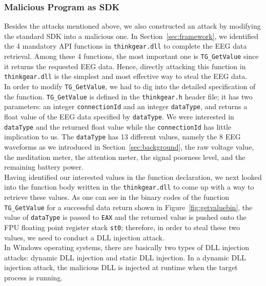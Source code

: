 \subsubsection{Malicious Program as SDK}
Besides the attacks mentioned above, we also constructed an attack by modifying the standard SDK into a malicious one. In Section~\ref{sec:framework}, we identified the 4 mandatory API functions in \texttt{thinkgear.dll} to complete the EEG data retrieval. Among these 4 functions, the most important one is \texttt{TG\_GetValue} since it returns the requested EEG data. Hence, directly attacking this function in \texttt{thinkgear.dll} is the simplest and most effective way to steal the EEG data. \\
%
\indent In order to modify \texttt{TG\_GetValue}, we had to dig into the detailed specification of the function. \texttt{TG\_GetValue} is defined in the \texttt{thinkgear.h} header file; it has two parameters: an integer \texttt{connectionId} and an integer \texttt{dataType}, and returns a float value of the EEG data specified by \texttt{dataType}. We were interested in \texttt{dataType} and the returned float value while the \texttt{connectionId} has little implication to us. The \texttt{dataType} has 13 different values, namely the 8 EEG waveforms as we introduced in Section~\ref{sec:background}, the raw voltage value, the meditation meter, the attention meter, the signal poorness level, and the remaining battery power.\\
%
\indent Having identified our interested values in the function declaration, we next looked into the function body written in the \texttt{thinkgear.dll} to come up with a way to retrieve these values. As one can see in the binary codes of the function \texttt{TG\_GetValue} for a successful data return shown in Figure~\ref{fig:getvaluebin}, the value of \texttt{dataType} is passed to \texttt{EAX} and the returned value is pushed onto the FPU floating point register stack \texttt{st0}; therefore, in order to steal these two values, we need to conduct a DLL injection attack.\\
%
\indent In Windows operating systems, there are basically two types of DLL injection attacks: dynamic DLL injection and static DLL injection. In a dynamic DLL injection attack, the malicious DLL is injected at runtime when the target process is running. %
